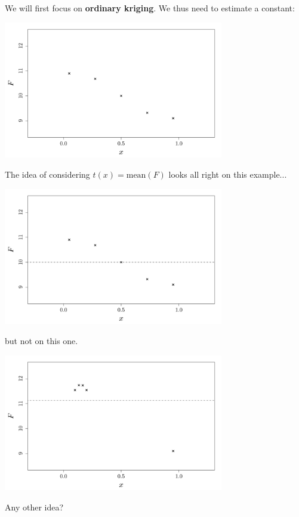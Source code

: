 \documentclass{beamer}
\begin{document}
\begin{frame}{}
We will first focus on \textbf{ordinary kriging}. We thus need to estimate a constant:\\ \vspace{5mm} 
\begin{center}
	\includegraphics[height=6cm]{figures/R/trend_dataordinary}
\end{center}
\end{frame}

\begin{frame}{}
The idea of considering $t(x)=\text{mean}(F)$ looks all right on this example...
\begin{center}
	\includegraphics[height=6cm]{figures/R/trend_basicordinary}
\end{center}
\end{frame}

\begin{frame}{}
but not on this one.
\begin{center}
	\includegraphics[height=6cm]{figures/R/trend_pbbasicordinary}
\end{center}
Any other idea?
\end{frame}
\end{document}
